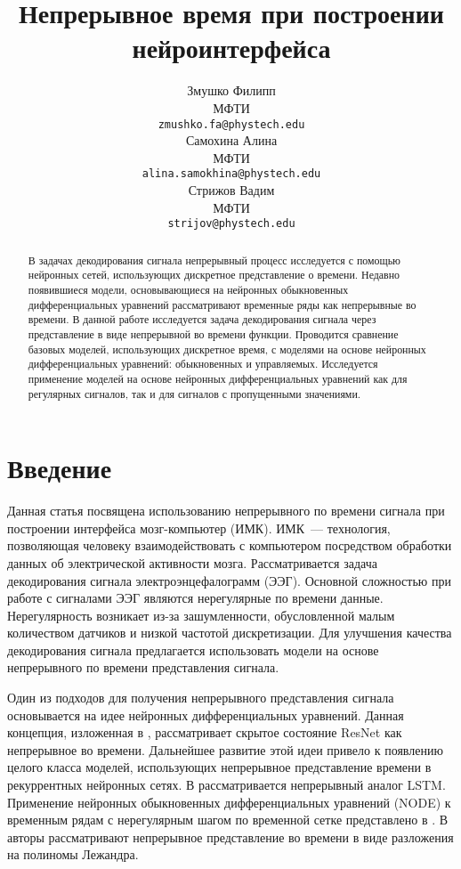\documentclass{article}
\title{Непрерывное время при построении нейроинтерфейса}
\author{ Змушко Филипп \\
	МФТИ \\
	\texttt{zmushko.fa@phystech.edu} \\
	\And
	Самохина Алина \\
	МФТИ\\
	\texttt{alina.samokhina@phystech.edu} \\
	\And
	Стрижов Вадим \\
	МФТИ\\
	\texttt{strijov@phystech.edu} \\
}
\date{}
\begin{document}
\maketitle

\begin{abstract}
	В задачах декодирования сигнала непрерывный процесс исследуется с помощью нейронных сетей, использующих дискретное представление о времени. Недавно появившиеся модели, основывающиеся на нейронных обыкновенных дифференциальных уравнений рассматривают временные ряды как непрерывные во времени.
    В данной работе исследуется задача декодирования сигнала через представление в виде непрерывной во времени функции. Проводится сравнение базовых моделей, использующих дискретное время, с моделями на основе нейронных дифференциальных уравнений: обыкновенных и управляемых. Исследуется применение моделей на основе нейронных дифференциальных уравнений как для регулярных сигналов, так и для сигналов с пропущенными значениями. 
\end{abstract}



\section{Введение}
Данная статья посвящена  использованию непрерывного по времени сигнала при построении интерфейса мозг-компьютер (ИМК). ИМК~--- технология, позволяющая человеку взаимодействовать с компьютером посредством обработки данных об электрической активности мозга. Рассматривается задача декодирования сигнала электроэнцефалограмм (ЭЭГ). Основной сложностью при работе с сигналами ЭЭГ являются нерегулярные по времени данные. Нерегулярность возникает из-за зашумленности, обусловленной малым количеством датчиков и низкой частотой дискретизации. Для улучшения качества декодирования сигнала предлагается использовать модели на основе непрерывного по времени представления сигнала.

Один из подходов для получения непрерывного представления сигнала основывается на идее нейронных дифференциальных уравнений. Данная концепция, изложенная в \cite{NEURIPS2018_69386f6b}, рассматривает скрытое состояние ResNet как непрерывное во времени. Дальнейшее развитие этой идеи привело к появлению целого класса моделей, использующих непрерывное представление времени в рекуррентных нейронных сетях. В \cite{lechner2020longterm} рассматривается непрерывный аналог LSTM. Применение нейронных обыкновенных дифференциальных уравнений (NODE) к временным рядам с нерегулярным шагом по временной сетке представлено в \cite{cde}. В \cite{NEURIPS2019_952285b9} авторы рассматривают непрерывное представление во времени в виде разложения на полиномы Лежандра. 
\end{document}
